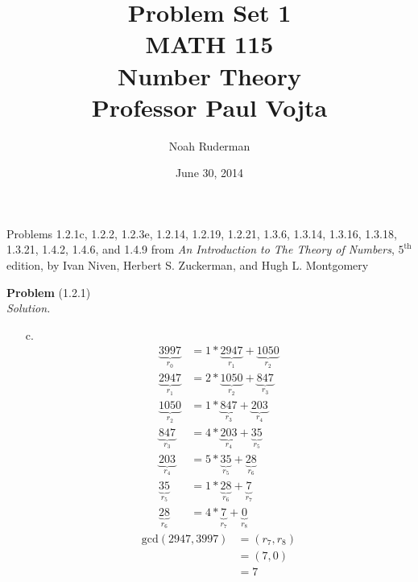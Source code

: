 \documentclass[12 pt]{amsart}
\begin{document}
\allowdisplaybreaks
\title
[Problem Set 1]
{Problem Set 1 \\
MATH 115 \\
Number Theory \\
Professor Paul Vojta}

\author{Noah Ruderman}

\date{ June 30, 2014}

\maketitle
\begin{center}
	Problems 1.2.1c, 1.2.2, 1.2.3e, 1.2.14, 1.2.19, 1.2.21, 1.3.6, 1.3.14, 1.3.16, 1.3.18, 1.3.21, 1.4.2, 1.4.6, and 1.4.9 
	from \emph{An Introduction to The Theory of Numbers}, 
	$5^{\text{th}}$ edition,
	by Ivan Niven, Herbert S. Zuckerman, and Hugh L. Montgomery 
\end{center}

\phantom{\quad} \vfill
\noindent
\textbf{Problem} (1.2.1) \\[4ex]
\emph{Solution.} \\[2ex]
	\begin{enumerate}
		\item[c.]
      \begin{align*}
        \underbrace{3997}_{r_0} 
        &= 1 * \underbrace{2947}_{r_1} + \underbrace{1050}_{r_2} \\
        \underbrace{2947}_{r_1} 
        &= 2 * \underbrace{1050}_{r_2} + \underbrace{847}_{r_3} \\
        \underbrace{1050}_{r_2} &= 1 * \underbrace{847}_{r_3} + \underbrace{203}_{r_4} \\
        \underbrace{847}_{r_3}  &= 4 * \underbrace{203}_{r_4} + \underbrace{35}_{r_5} \\
        \underbrace{203}_{r_4}  &= 5 * \underbrace{35}_{r_5}  + \underbrace{28}_{r_6} \\
        \underbrace{35}_{r_5}   &= 1 * \underbrace{28}_{r_6}  + \underbrace{7}_{r_7}  \\
        \underbrace{28}_{r_6}   &= 4 * \underbrace{7}_{r_7}   + \underbrace{0}_{r_8}
      \end{align*}
      \begin{align*}
        \text{gcd}(2947, 3997) &= (r_7, r_8) \\
                               &= (7, 0) \\
                               &= 7
      \end{align*}
	\end{enumerate}
\vfill
\newpage
\end{document}
